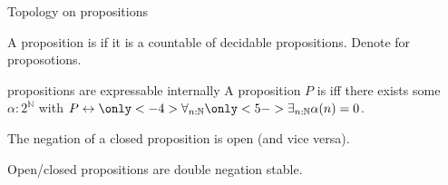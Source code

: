 \documentclass{beamer}
\begin{document}
\begin{frame}{Topology on propositions}
  \begin{definition}
  A proposition is  if it is a countable 
   of decidable propositions. 
  \pause Denote  for  
  proposotions. 
\end{definition}
\pause 
\begin{block}{
   
  propositions are expressable internally}
  A proposition $P$ is 
  iff \pause there exists some $\alpha:2^\mathbb N$ with 
  $P\leftrightarrow \only<-4>{\forall_{n:\mathbb N}}\only<5->{{\exists}_{n:\mathbb N}}\alpha(n) = 0$.
\end{block}
\pause
\pause
\begin{corollary}
  The negation of a closed proposition is open
  \pause (and vice versa). 
\end{corollary}
\pause 
\begin{corollary}
  Open/closed propositions are double negation stable. 
\end{corollary}
\end{frame}
\end{document}
